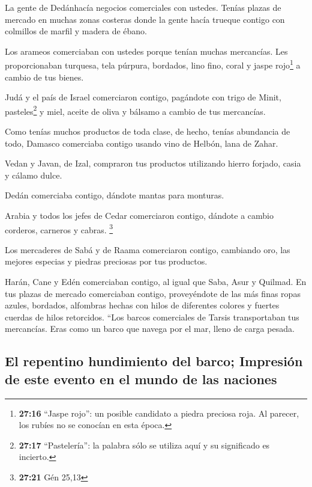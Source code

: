  La gente de Dedánhacía negocios comerciales con ustedes.
Tenías plazas de mercado en muchas zonas costeras donde la gente hacía
trueque contigo con colmillos de marfil y madera de ébano.

 Los arameos comerciaban con ustedes porque tenían muchas
mercancías. Les proporcionaban turquesa, tela púrpura, bordados, lino
fino, coral y jaspe rojo\footnote{\textbf{27:16} ``Jaspe rojo'': un
  posible candidato a piedra preciosa roja. Al parecer, los rubíes no se
  conocían en esta época.} a cambio de tus bienes.

 Judá y el país de Israel comerciaron contigo, pagándote
con trigo de Minit, pasteles\footnote{\textbf{27:17} ``Pastelería'': la
  palabra sólo se utiliza aquí y su significado es incierto.} y miel,
aceite de oliva y bálsamo a cambio de tus mercancías.

 Como tenías muchos productos de toda clase, de hecho,
tenías abundancia de todo, Damasco comerciaba contigo usando vino de
Helbón, lana de Zahar.

 Vedan y Javan, de Izal, compraron tus productos
utilizando hierro forjado, casia y cálamo dulce.

 Dedán comerciaba contigo, dándote mantas para monturas.

 Arabia y todos los jefes de Cedar comerciaron contigo,
dándote a cambio corderos, carneros y cabras. \footnote{\textbf{27:21}
  Gén 25,13}

 Los mercaderes de Sabá y de Raama comerciaron contigo,
cambiando oro, las mejores especias y piedras preciosas por tus
productos.

 Harán, Cane y Edén comerciaban contigo, al igual que
Saba, Asur y Quilmad.  En tus plazas de mercado
comerciaban contigo, proveyéndote de las más finas ropas azules,
bordados, alfombras hechas con hilos de diferentes colores y fuertes
cuerdas de hilos retorcidos.  ``Los barcos comerciales de
Tarsis transportaban tus mercancías. Eras como un barco que navega por
el mar, lleno de carga pesada.

\hypertarget{el-repentino-hundimiento-del-barco-impresiuxf3n-de-este-evento-en-el-mundo-de-las-naciones}{%
\subsection{El repentino hundimiento del barco; Impresión de este evento
en el mundo de las
naciones}\label{el-repentino-hundimiento-del-barco-impresiuxf3n-de-este-evento-en-el-mundo-de-las-naciones}}


